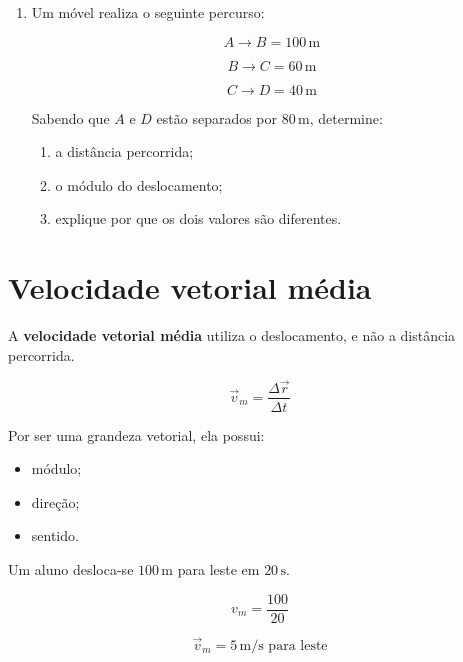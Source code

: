\documentclass[a4paper,12pt]{article}
\begin{document}
\begin{enumerate}
\vspace{1.5cm}


\item Um móvel realiza o seguinte percurso:

\[
A\rightarrow B=100\,\text{m}
\]

\[
B\rightarrow C=60\,\text{m}
\]

\[
C\rightarrow D=40\,\text{m}
\]

Sabendo que $A$ e $D$ estão separados por $80\,\text{m}$,
determine:

\begin{enumerate}
    \item a distância percorrida;
    \item o módulo do deslocamento;
    \item explique por que os dois valores são diferentes.
\end{enumerate}

\end{enumerate}


\section{Velocidade vetorial média}

\begin{ideia}

A \textbf{velocidade vetorial média} utiliza o deslocamento,
e não a distância percorrida.

\[
\boxed{
\vec v_m=
\frac{\Delta\vec r}{\Delta t}
}
\]

Por ser uma grandeza vetorial, ela possui:

\begin{itemize}
    \item módulo;
    \item direção;
    \item sentido.
\end{itemize}

\end{ideia}


\begin{exemplo}

Um aluno desloca-se $100\,\text{m}$ para leste em $20\,\text{s}$.

\[
v_m=\frac{100}{20}
\]

\[
\boxed{
\vec v_m=
5\,\text{m/s para leste}
}
\]

\end{exemplo}
\end{document}
